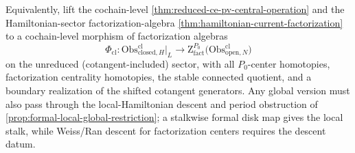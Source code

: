 \documentclass[11pt]{memoir}
\begin{document}
\begin{prob}
  Equivalently, lift the cochain-level
  \ref{thm:reduced-ce-pv-central-operation} and the Hamiltonian-sector
  factorization-algebra
  \ref{thm:hamiltonian-current-factorization} to a
  cochain-level morphism of factorization algebras
  $$\Phi_{\mathrm{cl}}:
    \mathrm{Obs}^{\mathrm{cl}}_{\mathrm{closed},H}\big|_{L}
    \longrightarrow
    \mathrm Z^{P_0}_{\mathrm{fact}}\bigl(\mathrm{Obs}^{\mathrm{cl}}_{\mathrm{open},N}\bigr)$$
  on the unreduced (cotangent-included) sector, with all $P_0$-center
  homotopies, factorization centrality homotopies, the stable
  connected quotient, and a boundary realization of the shifted
  cotangent generators. Any global version must also pass through the
  local-Hamiltonian descent and period obstruction of
  \ref{prop:formal-local-global-restriction}; a stalkwise formal
	  disk map gives the local stalk, while Weiss/Ran descent for
  factorization centers requires the descent datum.
\end{prob}


\end{document}
